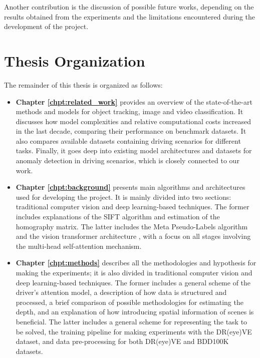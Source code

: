 Another contribution is the discussion of possible future works, 
depending on the results obtained from the experiments and the limitations 
encountered during the development of the project.


\section{Thesis Organization}
\label{sec:organization}
The remainder of this thesis is organized as follows: 
\begin{itemize}
    \item \textbf{Chapter \ref{chpt:related_work}} provides an overview of the 
    state-of-the-art methods and models for object tracking, image and video 
    classification. It discusses how model complexities and relative computational 
    costs increased in the last decade, comparing their performance on benchmark 
    datasets. It also compares available datasets containing driving scenarios 
    for different tasks. Finally, it goes deep into existing model architectures 
    and datasets for anomaly detection in driving scenarios, which is closely 
    connected to our work.
    \item \textbf{Chapter \ref{chpt:background}} presents main algorithms and 
    architectures used for developing the project. It is mainly divided into 
    two sections: traditional computer vision and deep learning-based techniques.
    The former includes explanations of the SIFT algorithm \cite{lowe_sift} and 
    estimation of the homography matrix. The latter includes the Meta Pseudo-Labels 
    algorithm \cite{pham2021meta} and the vision transformer architecture \cite{vit},
    with a focus on all stages involving the multi-head self-attention mechanism.
    \item \textbf{Chapter \ref{chpt:methods}} describes all the methodologies 
    and hypothesis for making the experiments; it is also divided in traditional 
    computer vision and deep learning-based techniques.
    The former includes a general scheme of the driver's attention model, 
    a description of how data is structured and processed, a brief comparison of 
    possible methodologies for estimating the depth, and an explanation of how 
    introducing spatial information of scenes is beneficial.
    The latter includes a general scheme for representing the task to be solved, 
    the training pipeline for making experiments with the DR(eye)VE dataset, and 
    data pre-processing for both DR(eye)VE \cite{dreyeve} and BDD100K 
    \cite{bdd100k} datasets. 

\end{itemize}
